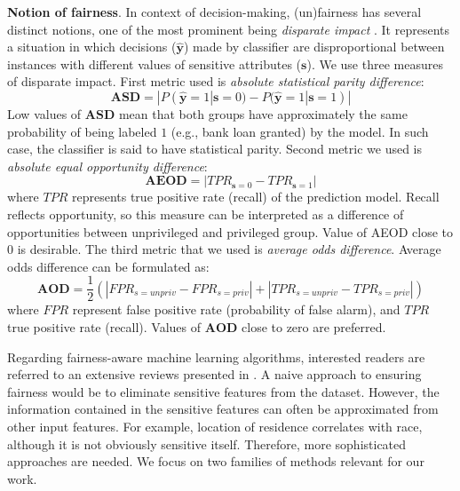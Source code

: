 \documentclass[preprint,12pt]{elsarticle}
\begin{document}
\textbf{Notion of fairness}. In context of decision-making, (un)fairness has several distinct notions, one of the most prominent being {\em disparate impact} \cite{barocas2016big}. It represents a situation in which decisions ($\hat{\mathbf{y}}$) made by classifier are disproportional between instances with different values of sensitive attributes ($\mathbf{s}$). We use three measures of disparate impact. First metric used is \textit{absolute statistical parity difference}:
\begin{equation}
\mathbf{ASD} = |P(\hat{\mathbf{y}}=1|\mathbf{s}=0) - P(\hat{\mathbf{y}}=1|\mathbf{s}=1)|
\label{metric:asd}
\end{equation}
Low values of $\mathbf{ASD}$ mean that both groups have approximately the same probability of being labeled $1$ (e.g., bank loan granted) by the model. In such case, the classifier is said to have statistical parity.
Second metric we used is \textit{absolute equal opportunity difference}:
\begin{equation}
\mathbf{AEOD} = |TPR_{\mathbf{s}=0} - TPR_{\mathbf{s}=1}|
\label{metric:aeod}
\end{equation}
where $TPR$ represents true positive rate (recall) of the prediction model. Recall reflects opportunity, so this measure can be interpreted as a difference of opportunities between unprivileged and privileged group. Value of AEOD close to 0 is desirable. The third metric that we used is \textit{average odds difference}. Average odds difference can be formulated as:
\begin{equation}
\mathbf{AOD} = \frac{1}{2}(|FPR_{s=unpriv} - FPR_{s=priv}| + |TPR_{s=unpriv} - TPR_{s=priv}|)
\label{metric:aod}
\end{equation}
where $FPR$ represent false positive rate (probability of false alarm), and $TPR$ true positive rate (recall). Values of $\mathbf{AOD}$ close to zero are preferred.

Regarding fairness-aware machine learning algorithms, interested readers are referred to an extensive reviews presented in \cite{friedler2019comparative, bacelar2021monitoring, corbett2018measure, caton2020fairness}. A naive approach to ensuring fairness would be to eliminate sensitive features from the dataset. However, the information contained in the sensitive features can often be approximated from other input features. For example, location of residence correlates with race, although it is not obviously sensitive itself. Therefore, more sophisticated approaches are needed. We focus on two families of methods relevant for our work.
\end{document}
